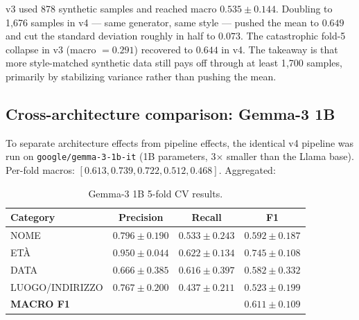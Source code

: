 \documentclass[11pt,a4paper]{article}
\begin{document}
v3 used 878 synthetic samples and reached macro $0.535 \pm 0.144$. Doubling to 1{,}676 samples in v4 — same generator, same style — pushed the mean to $0.649$ and cut the standard deviation roughly in half to $0.073$. The catastrophic fold-5 collapse in v3 (macro $= 0.291$) recovered to $0.644$ in v4. The takeaway is that more style-matched synthetic data still pays off through at least 1{,}700 samples, primarily by stabilizing variance rather than pushing the mean.

\subsection{Cross-architecture comparison: Gemma-3 1B}

To separate architecture effects from pipeline effects, the identical v4 pipeline was run on \texttt{google/gemma-3-1b-it} (1B parameters, 3$\times$ smaller than the Llama base). Per-fold macros: $[0.613, 0.739, 0.722, 0.512, 0.468]$. Aggregated:

\begin{table}[h]
\centering
\caption{Gemma-3 1B 5-fold CV results.}
\label{tab:gemma1b}
\begin{tabular}{lccc}
\toprule
Category & Precision & Recall & \textbf{F1} \\
\midrule
NOME              & $0.796 \pm 0.190$ & $0.533 \pm 0.243$ & $0.592 \pm 0.187$ \\
ETÀ               & $0.950 \pm 0.044$ & $0.622 \pm 0.134$ & $\mathbf{0.745 \pm 0.108}$ \\
DATA              & $0.666 \pm 0.385$ & $0.616 \pm 0.397$ & $0.582 \pm 0.332$ \\
LUOGO/INDIRIZZO   & $0.767 \pm 0.200$ & $0.437 \pm 0.211$ & $0.523 \pm 0.199$ \\
\midrule
\textbf{MACRO F1} & & & $\mathbf{0.611 \pm 0.109}$ \\
\bottomrule
\end{tabular}
\end{table}
\end{document}
